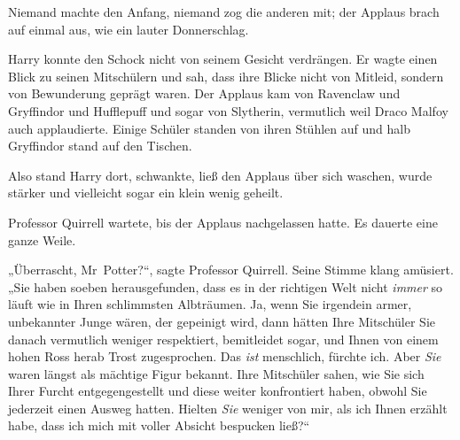 Niemand machte den Anfang, niemand zog die anderen mit; der Applaus brach auf einmal aus, wie ein lauter Donnerschlag.

Harry konnte den Schock nicht von seinem Gesicht verdrängen. Er wagte einen Blick zu seinen Mitschülern und sah, dass ihre Blicke nicht von Mitleid, sondern von Bewunderung geprägt waren. Der Applaus kam von Ravenclaw und Gryffindor und Hufflepuff und sogar von Slytherin, vermutlich weil Draco Malfoy auch applaudierte. Einige Schüler standen von ihren Stühlen auf und halb Gryffindor stand auf den Tischen.

Also stand Harry dort, schwankte, ließ den Applaus über sich waschen, wurde stärker und vielleicht sogar ein klein wenig geheilt.

Professor Quirrell wartete, bis der Applaus nachgelassen hatte. Es dauerte eine ganze Weile.

„Überrascht, Mr~Potter?“, sagte Professor Quirrell. Seine Stimme klang amüsiert. „Sie haben soeben herausgefunden, dass es in der richtigen Welt nicht \emph{immer} so läuft wie in Ihren schlimmsten Albträumen. Ja, wenn Sie irgendein armer, unbekannter Junge wären, der gepeinigt wird, dann hätten Ihre Mitschüler Sie danach vermutlich weniger respektiert, bemitleidet sogar, und Ihnen von einem hohen Ross herab Trost zugesprochen. Das \emph{ist} menschlich, fürchte ich. Aber \emph{Sie} waren längst als mächtige Figur bekannt. Ihre Mitschüler sahen, wie Sie sich Ihrer Furcht entgegengestellt und diese weiter konfrontiert haben, obwohl Sie jederzeit einen Ausweg hatten. Hielten \emph{Sie} weniger von mir, als ich Ihnen erzählt habe, dass ich mich mit voller Absicht bespucken ließ?“

